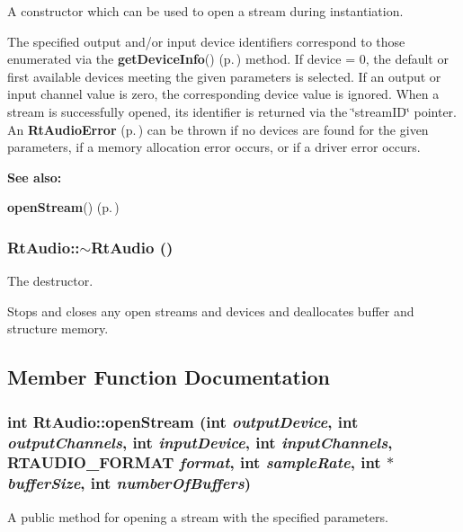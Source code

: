 A constructor which can be used to open a stream during instantiation.

The specified output and/or input device identifiers correspond to those enumerated via the {\bf get\-Device\-Info}() {\rm (p.\,\pageref{classRtAudio_a7})} method. If device = 0, the default or first available devices meeting the given parameters is selected. If an output or input channel value is zero, the corresponding device value is ignored. When a stream is successfully opened, its identifier is returned via the \char`\"{}stream\-ID\char`\"{} pointer. An {\bf Rt\-Audio\-Error} {\rm (p.\,\pageref{classRtAudioError})} can be thrown if no devices are found for the given parameters, if a memory allocation error occurs, or if a driver error occurs. \begin{Desc}
\item[{\bf See also: }]\par
{\bf open\-Stream}() {\rm (p.\,\pageref{classRtAudio_a3})} \end{Desc}
\subsubsection{\setlength{\rightskip}{0pt plus 5cm}Rt\-Audio::$\sim$Rt\-Audio ()}\label{classRtAudio_a2}


The destructor.

Stops and closes any open streams and devices and deallocates buffer and structure memory. 

\subsection{Member Function Documentation}
\subsubsection{\setlength{\rightskip}{0pt plus 5cm}int Rt\-Audio::open\-Stream (int {\em output\-Device}, int {\em output\-Channels}, int {\em input\-Device}, int {\em input\-Channels}, {\bf RTAUDIO\_\-FORMAT} {\em format}, int {\em sample\-Rate}, int $\ast$ {\em buffer\-Size}, int {\em number\-Of\-Buffers})}\label{classRtAudio_a3}


A public method for opening a stream with the specified parameters.

